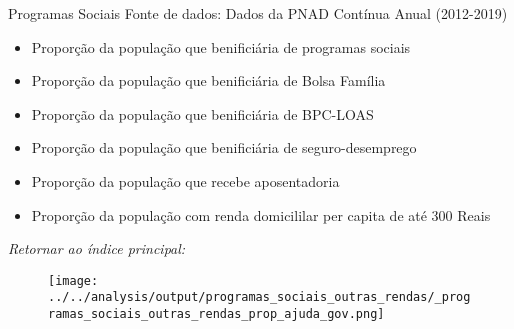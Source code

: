 \begin{frame}[label=_programas_sociais]{Programas Sociais}
{\footnotesize Fonte de dados: Dados da PNAD Contínua Anual (2012-2019)}
\begin{itemize}
\item{Proporção da população que benificiária de programas sociais \hyperlink{_programas_sociais_outras_rendas_prop_ajuda_gov}{}}
\item{Proporção da população que benificiária de Bolsa Família  \hyperlink{_programas_sociais_outras_rendas_prop_bolsa_familia}{}}
\item{Proporção da população que benificiária de BPC-LOAS  \hyperlink{_programas_sociais_outras_rendas_prop_bpc_loas}{}}

\item{Proporção da população que benificiária de seguro-desemprego  \hyperlink{_programas_sociais_outras_rendas_prop_seguro_desemprego}{}}

\item{Proporção da população que recebe aposentadoria  \hyperlink{_programas_sociais_outras_rendas_prop_aposentadoria}{}}

\item{Proporção da população com renda domicililar per capita de até 300 Reais \hyperlink{_programas_sociais_outras_rendas_prop_renda_anual_pc_300}{}}

\end{itemize}

\begin{small}
\textit{Retornar ao índice principal: \hyperlink{indice_principal}{} }
\end{small}

\end{frame}

\begin{frame}[label=_programas_sociais_outras_rendas_prop_ajuda_gov]{}
\textit{\hyperlink{_programas_sociais}{}}
\begin{figure}
  \centering
  \texttt{[image: ../../analysis/output/programas\_sociais\_outras\_rendas/\_programas\_sociais\_outras\_rendas\_prop\_ajuda\_gov.png]}
  \caption{}
  \label{fig:_programas_sociais_outras_rendas_prop_ajuda_gov}
\end{figure}
\end{frame}

